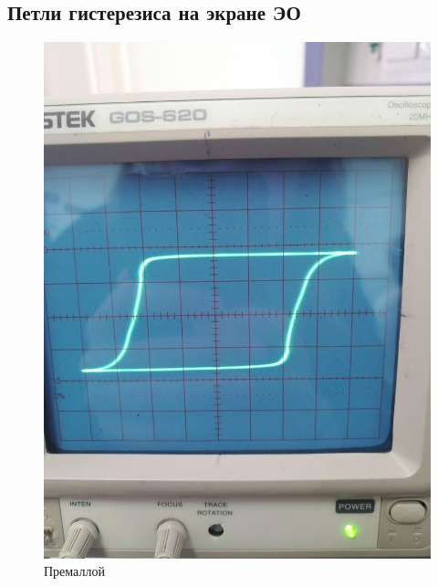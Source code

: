 \documentclass[14pt,a4paper]{article}
\begin{document}
\subsection*{Петли гистерезиса на экране ЭО}
\begin{figure}[H]
  \includegraphics*[width=\textwidth]{2023-09-30-18-30-19.png}
  \caption{Премаллой}
\end{figure}
\end{document}
